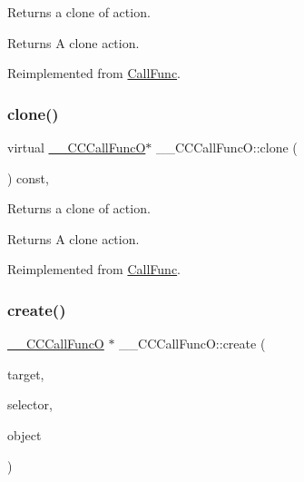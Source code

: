 Returns a clone of action.

\begin{DoxyReturn}{Returns}
A clone action. 
\end{DoxyReturn}


Reimplemented from \hyperlink{classCallFunc_a87c2d0fecf4d8ae9d4b58a28e594daf0}{Call\+Func}.

\mbox{\label{class____CCCallFuncO_a83119c4b99a7f866556d0e2945ebd61b}} 
\subsubsection{\texorpdfstring{clone()}{clone()}\hspace{0.1cm}{\footnotesize\ttfamily [2/2]}}
{\footnotesize\ttfamily virtual \hyperlink{class____CCCallFuncO}{\+\_\+\+\_\+\+C\+C\+Call\+FuncO}$\ast$ \+\_\+\+\_\+\+C\+C\+Call\+Func\+O\+::clone (\begin{DoxyParamCaption}\item[{void}]{ }\end{DoxyParamCaption}) const\hspace{0.3cm}{\ttfamily [override]}, {\ttfamily [virtual]}}

Returns a clone of action.

\begin{DoxyReturn}{Returns}
A clone action. 
\end{DoxyReturn}


Reimplemented from \hyperlink{classCallFunc_a87c2d0fecf4d8ae9d4b58a28e594daf0}{Call\+Func}.

\mbox{\label{class____CCCallFuncO_ad617de0f264ccc8d5450507bd4e0f3f1}} 
\subsubsection{\texorpdfstring{create()}{create()}\hspace{0.1cm}{\footnotesize\ttfamily [1/2]}}
{\footnotesize\ttfamily \hyperlink{class____CCCallFuncO}{\+\_\+\+\_\+\+C\+C\+Call\+FuncO} $\ast$ \+\_\+\+\_\+\+C\+C\+Call\+Func\+O\+::create (\begin{DoxyParamCaption}\item[{\hyperlink{classRef}{Ref} $\ast$}]{target,  }\item[{S\+E\+L\+\_\+\+Call\+FuncO}]{selector,  }\item[{\hyperlink{classRef}{Ref} $\ast$}]{object }\end{DoxyParamCaption})\hspace{0.3cm}{\ttfamily [static]}}

